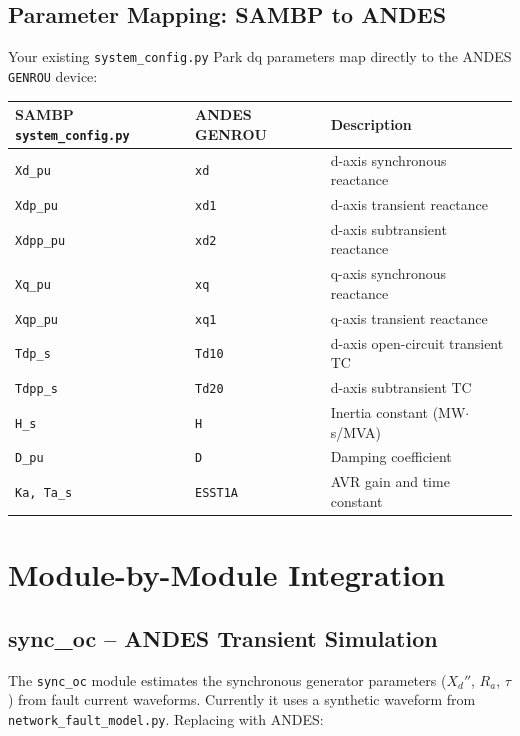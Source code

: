 \documentclass[11pt,a4paper]{article}
\begin{document}
\subsection{Parameter Mapping: SAMBP to ANDES}

Your existing \texttt{system\_config.py} Park dq parameters map
directly to the ANDES \texttt{GENROU} device:

\begin{center}
\begin{tabular}{lll}
\toprule
\textbf{SAMBP \texttt{system\_config.py}} & \textbf{ANDES GENROU} & \textbf{Description} \\
\midrule
\texttt{Xd\_pu}   & \texttt{xd}    & d-axis synchronous reactance \\
\texttt{Xdp\_pu}  & \texttt{xd1}   & d-axis transient reactance \\
\texttt{Xdpp\_pu} & \texttt{xd2}   & d-axis subtransient reactance \\
\texttt{Xq\_pu}   & \texttt{xq}    & q-axis synchronous reactance \\
\texttt{Xqp\_pu}  & \texttt{xq1}   & q-axis transient reactance \\
\texttt{Tdp\_s}   & \texttt{Td10}  & d-axis open-circuit transient TC \\
\texttt{Tdpp\_s}  & \texttt{Td20}  & d-axis subtransient TC \\
\texttt{H\_s}     & \texttt{H}     & Inertia constant (MW$\cdot$s/MVA) \\
\texttt{D\_pu}    & \texttt{D}     & Damping coefficient \\
\texttt{Ka, Ta\_s}& \texttt{ESST1A}& AVR gain and time constant \\
\bottomrule
\end{tabular}
\end{center}

\section{Module-by-Module Integration}

\subsection{sync\_oc -- ANDES Transient Simulation}

The \texttt{sync\_oc} module estimates the synchronous generator
parameters ($X_d''$, $R_a$, $\tau$) from fault current waveforms.
Currently it uses a synthetic waveform from \texttt{network\_fault\_model.py}.
Replacing with ANDES:
\end{document}

